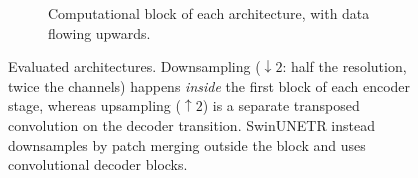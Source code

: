 \begin{figure}[!t]
\begin{subfigure}[b]{\textwidth}
{\begin{tikzpicture}[dcbase]
\end{tikzpicture}}
\caption{Computational block of each architecture, with data flowing upwards.}
\label{fig:blocks}
\end{subfigure}

\caption{Evaluated architectures. Downsampling ($\downarrow 2$: half the
resolution, twice the channels) happens \emph{inside} the first block of each
encoder stage, whereas upsampling ($\uparrow 2$) is a separate transposed
convolution on the decoder transition. SwinUNETR instead downsamples by patch
merging outside the block and uses convolutional decoder blocks.}
\label{fig:architectures}

\end{figure}
